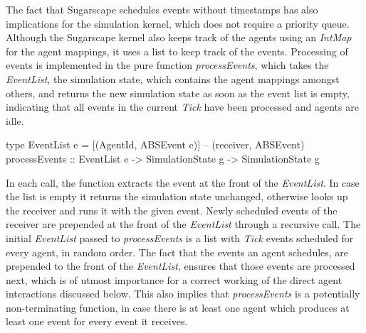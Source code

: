 The fact that Sugarscape schedules events without timestamps has also implications for the simulation kernel, which does not require a priority queue. Although the Sugarscape kernel also keeps track of the agents using an \textit{IntMap} for the agent mappings, it uses a list to keep track of the events. Processing of events is implemented in the pure function \textit{processEvents}, which takes the \textit{EventList}, the simulation state, which contains the agent mappings amongst others, and returns the new simulation state as soon as the event list is empty, indicating that all events in the current \textit{Tick} have been processed and agents are idle.

\begin{HaskellCode}
type EventList e = [(AgentId, ABSEvent e)] -- (receiver, ABSEvent)
processEvents :: EventList e -> SimulationState g -> SimulationState g
\end{HaskellCode}

In each call, the function extracts the event at the front of the \textit{EventList}. In case the list is empty it returns the simulation state unchanged, otherwise looks up the receiver and runs it with the given event. Newly scheduled events of the receiver are prepended at the front of the \textit{EventList} through a recursive call. The initial \textit{EventList} passed to \textit{processEvents} is a list with \textit{Tick} events scheduled for every agent, in random order. The fact that the events an agent schedules, are prepended to the front of the \textit{EventList}, ensures that those events are processed next, which is of utmost importance for a correct working of the direct agent interactions discussed below. This also implies that \textit{processEvents} is a potentially non-terminating function, in case there is at least one agent which produces at least one event for every event it receives.